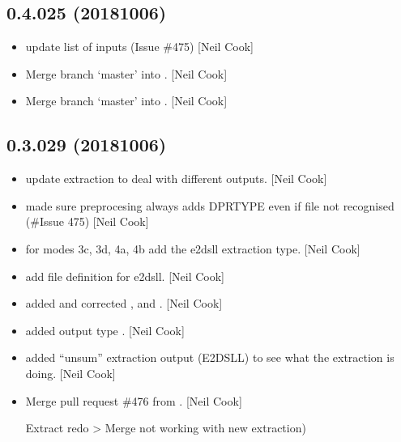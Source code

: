 \documentclass[a4paper,10pt,english]{report}
\begin{document}
\subsection{0.4.025 (2018\sphinxhyphen{}10\sphinxhyphen{}06)}
\label{\detokenize{misc/changelog:id320}}\begin{itemize}
\item {} 
 \sphinxhyphen{} update list of inputs (Issue \#475) {[}Neil Cook{]}

\item {} 
Merge branch ‘master’ into . {[}Neil Cook{]}

\item {} 
Merge branch ‘master’ into . {[}Neil Cook{]}

\end{itemize}


\subsection{0.3.029 (2018\sphinxhyphen{}10\sphinxhyphen{}06)}
\label{\detokenize{misc/changelog:id321}}\begin{itemize}
\item {} 
 \sphinxhyphen{} update extraction to deal with different
outputs. {[}Neil Cook{]}

\item {} 
 \sphinxhyphen{} made sure pre\sphinxhyphen{}procesing always adds DPRTYPE even if
file not recognised (\#Issue 475) {[}Neil Cook{]}

\item {} 
 \sphinxhyphen{} for modes 3c, 3d, 4a, 4b add the e2dsll extraction
type. {[}Neil Cook{]}

\item {} 
 \sphinxhyphen{} add file definition for e2dsll. {[}Neil Cook{]}

\item {} 
 \sphinxhyphen{} added and corrected ,  and
. {[}Neil Cook{]}

\item {} 
 \sphinxhyphen{} added output type . {[}Neil Cook{]}

\item {} 
 \sphinxhyphen{} added “un\sphinxhyphen{}sum” extraction output (E2DSLL)
to see what the extraction is doing. {[}Neil Cook{]}

\item {} 
Merge pull request \#476 from . {[}Neil Cook{]}

Extract redo \textendash{}\textgreater{} Merge  not working with new extraction)

\end{itemize}
\end{document}

